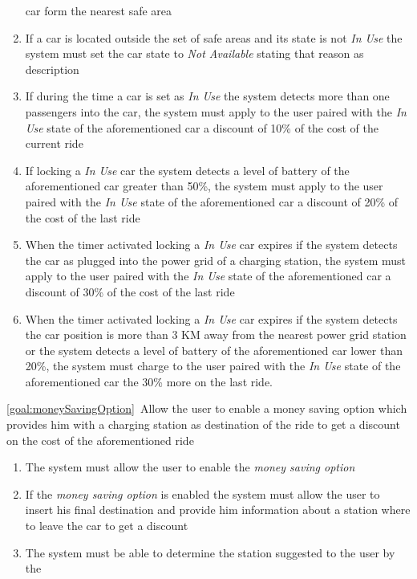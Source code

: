\begin{description}
\begin{enumerate}[resume*]
  				car form the nearest safe area
  				\item If a car is located outside the set of safe areas and its state is not \emph{In
  				Use} the system must set the car state to \emph{Not Available}  stating that reason as
  				description
  				\item If during the time a car is set as \emph{In Use} the system detects more than
  				one passengers into the car, the system must apply to the user paired with the
  				\emph{In Use} state of the aforementioned car a discount of 10\% of the cost of
  				the current ride
  				\item If locking  a \emph{In Use} car the system detects a level of battery of the
  				aforementioned car greater than 50\%, the system must apply to the user paired with
  				the \emph{In Use} state of the aforementioned car a discount of 20\% of the cost
  				of the last ride
  				\item When the timer activated locking a \emph{In Use} car expires if the system
  				detects the car as plugged into the power grid of a charging station, the system must
  				apply to the user paired with the \emph{In Use} state of the aforementioned car a
  				discount of 30\% of the cost of the last ride
  				\item When the timer activated locking a \emph{In Use} car expires if the system
  				detects the car position is more than 3 KM away from the nearest power grid station
  				or the system detects a level of battery of the aforementioned car lower than 20\%, 
  				the system must charge to the user paired with the \emph{In Use} state of the 
  				aforementioned car the 30\% more on the last ride. 
   			\end{enumerate}
  		\item \ref{goal:moneySavingOption}\ Allow the user to enable a money saving option which provides him with a charging station as destination of the ride to get a discount on the cost of the aforementioned ride
  			\begin{enumerate}[resume*]
  				\item The system must allow the user to enable the \emph{money saving option}
  				\item If the  \emph{money saving option} is enabled the system must allow the user
  				to insert his final destination and provide him information about a station where to
  				leave the car to get a discount
  				\item The system must be able to determine the station suggested to the user by the

\end{enumerate}
\end{description}
